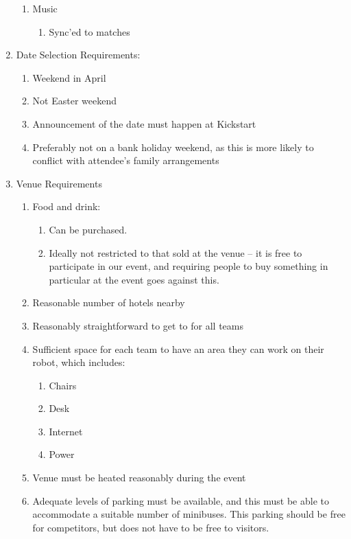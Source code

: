 \begin{enumerate}
\begin{enumerate}
  \item Music
    \begin{enumerate}
    \item Sync'ed to matches
    \end{enumerate}

  \end{enumerate}

\item Date Selection Requirements:
  \begin{enumerate}
  \item Weekend in April
  \item Not Easter weekend
  \item Announcement of the date must happen at Kickstart
  \item Preferably not on a bank holiday weekend, as this is more likely to conflict with attendee's family arrangements
  \end{enumerate}

\item Venue Requirements
    \begin{enumerate}
    \item Food and drink:
      \begin{enumerate}
      \item Can be purchased.
      \item Ideally not restricted to that sold at the venue -- it is free to participate in our event, and requiring people to buy something in particular at the event goes against this.
      \end{enumerate}
    \item Reasonable number of hotels nearby
    \item Reasonably straightforward to get to for all teams
    \item Sufficient space for each team to have an area they can work on their robot, which includes:
      \begin{enumerate}
      \item Chairs
      \item Desk
      \item Internet
      \item Power
      \end{enumerate}
    \item Venue must be heated reasonably during the event
    \item Adequate levels of parking must be available, and this must be able to accommodate a suitable number of minibuses.  This parking should be free for competitors, but does not have to be free to visitors. 
    \end{enumerate}


\end{enumerate}
